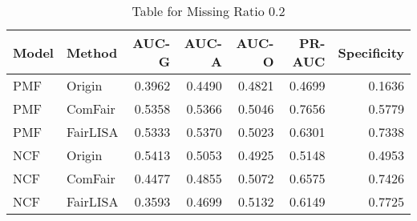 \begin{table}
\centering
\caption{Table for Missing Ratio 0.2}
\label{tab:missing_0.2}
\begin{tabular}{llrrrrr}
\toprule
Model &   Method &  AUC-G &  AUC-A &  AUC-O &  PR-AUC &  Specificity \\
\midrule
  PMF &   Origin & 0.3962 & 0.4490 & 0.4821 &  0.4699 &       0.1636 \\
  PMF &  ComFair & 0.5358 & 0.5366 & 0.5046 &  0.7656 &       0.5779 \\
  PMF & FairLISA & 0.5333 & 0.5370 & 0.5023 &  0.6301 &       0.7338 \\
  NCF &   Origin & 0.5413 & 0.5053 & 0.4925 &  0.5148 &       0.4953 \\
  NCF &  ComFair & 0.4477 & 0.4855 & 0.5072 &  0.6575 &       0.7426 \\
  NCF & FairLISA & 0.3593 & 0.4699 & 0.5132 &  0.6149 &       0.7725 \\
\bottomrule
\end{tabular}
\end{table}
